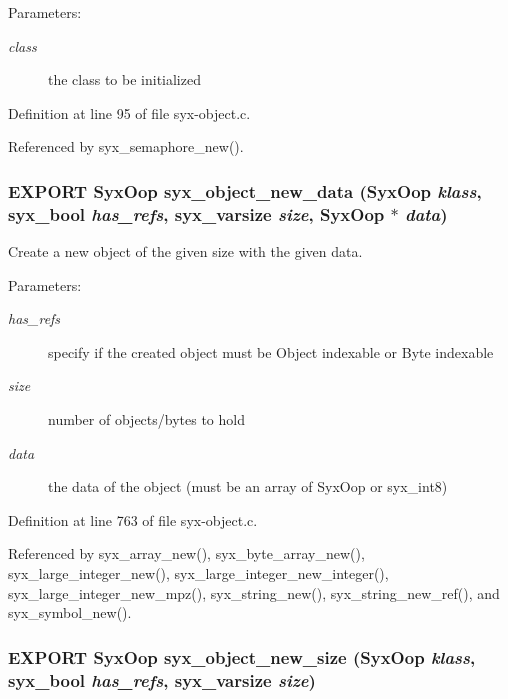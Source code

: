 \begin{Desc}
\item[Parameters:]
\begin{description}
\item[{\em class}]the class to be initialized \end{description}
\end{Desc}


Definition at line 95 of file syx-object.c.

Referenced by syx\_\-semaphore\_\-new().\hypertarget{syx-object_8h_4c50454bad3dd39c9e137207f870a2dc}{
\subsubsection{\setlength{\rightskip}{0pt plus 5cm}EXPORT {\bf SyxOop} syx\_\-object\_\-new\_\-data ({\bf SyxOop} {\em klass}, \/  {\bf syx\_\-bool} {\em has\_\-refs}, \/  {\bf syx\_\-varsize} {\em size}, \/  {\bf SyxOop} $\ast$ {\em data})}}
\label{syx-object_8h_4c50454bad3dd39c9e137207f870a2dc}


Create a new object of the given size with the given data.

\begin{Desc}
\item[Parameters:]
\begin{description}
\item[{\em has\_\-refs}]specify if the created object must be Object indexable or Byte indexable \item[{\em size}]number of objects/bytes to hold \item[{\em data}]the data of the object (must be an array of SyxOop or syx\_\-int8) \end{description}
\end{Desc}


Definition at line 763 of file syx-object.c.

Referenced by syx\_\-array\_\-new(), syx\_\-byte\_\-array\_\-new(), syx\_\-large\_\-integer\_\-new(), syx\_\-large\_\-integer\_\-new\_\-integer(), syx\_\-large\_\-integer\_\-new\_\-mpz(), syx\_\-string\_\-new(), syx\_\-string\_\-new\_\-ref(), and syx\_\-symbol\_\-new().\hypertarget{syx-object_8h_df2f65814fe225be62a0cc96b5570d15}{
\subsubsection{\setlength{\rightskip}{0pt plus 5cm}EXPORT {\bf SyxOop} syx\_\-object\_\-new\_\-size ({\bf SyxOop} {\em klass}, \/  {\bf syx\_\-bool} {\em has\_\-refs}, \/  {\bf syx\_\-varsize} {\em size})}}
\label{syx-object_8h_df2f65814fe225be62a0cc96b5570d15}



